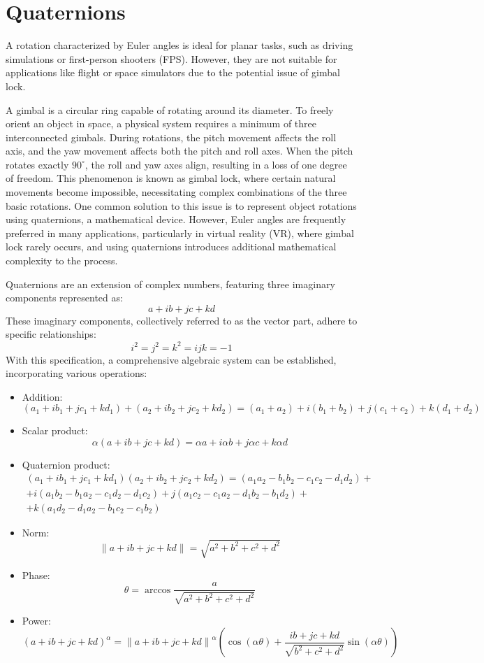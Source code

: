 \section{Quaternions}

A rotation characterized by Euler angles is ideal for planar tasks, such as driving simulations or first-person shooters (FPS). 
However, they are not suitable for applications like flight or space simulators due to the potential issue of gimbal lock.

A gimbal is a circular ring capable of rotating around its diameter. 
To freely orient an object in space, a physical system requires a minimum of three interconnected gimbals. 
During rotations, the pitch movement affects the roll axis, and the yaw movement affects both the pitch and roll axes. 
When the pitch rotates exactly $90^\circ$, the roll and yaw axes align, resulting in a loss of one degree of freedom. 
This phenomenon is known as gimbal lock, where certain natural movements become impossible, necessitating complex combinations of the three basic rotations. 
One common solution to this issue is to represent object rotations using quaternions, a mathematical device. 
However, Euler angles are frequently preferred in many applications, particularly in virtual reality (VR), where gimbal lock rarely occurs, and using quaternions introduces additional mathematical complexity to the process.

Quaternions are an extension of complex numbers, featuring three imaginary components represented as: 
\[a+ib+jc+kd\]
These imaginary components, collectively referred to as the vector part, adhere to specific relationships:
\[i^2=j^2=k^2=ijk=-1\]
With this specification, a comprehensive algebraic system can be established, incorporating various operations:
\begin{itemize}
    \item Addition: 
        \[(a_1 + ib_1 + jc_1+kd_1) + (a_2+ib_2+ jc_2 +kd_2 ) = (a_1+a_2 ) +i(b_1+b_2 ) + j (c_1+c_2) +k(d_1+d_2 )\]
    \item Scalar product: 
        \[\alpha (a+ib+ jc+kd) =\alpha a+i \alpha b+ j  \alpha c+k  \alpha d\]
    \item Quaternion product: 
        \begin{multline*}
            (a_1 + ib_1 + jc_1+kd_1)(a_2+ib_2+ jc_2 +kd_2 ) = (a_1a_2-b_1b_2-c_1c_2-d_1d_2)+ \\
            +i(a_1b_2-b_1a_2-c_1d_2-d_1c_2)+j(a_1c_2-c_1a_2-d_1b_2-b_1d_2)+\\
            +k(a_1d_2-d_1a_2-b_1c_2-c_1b_2)
        \end{multline*}
    \item Norm: 
        \[\left\lVert a+ib+jc+kd \right\rVert =\sqrt{a^2+b^2+c^2+d^2}\]
    \item Phase: 
        \[\theta=\arccos \dfrac{a}{\sqrt{a^2+b^2+c^2+d^2}}\]
    \item Power: 
        \[(a+ib+jc+kd)^\alpha=\left\lVert a+ib+jc+kd \right\rVert^\alpha\left( \cos(\alpha\theta)+\dfrac{ib+jc+kd}{\sqrt{b^2+c^2+d^2}}\sin(\alpha\theta) \right)\]
\end{itemize}


